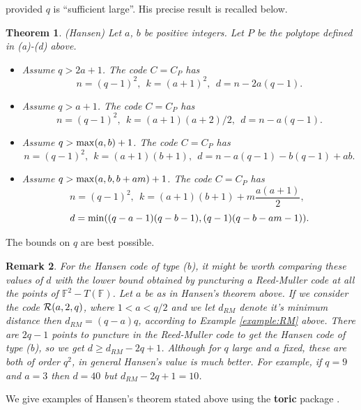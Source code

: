 \documentclass[12pt]{article}
\newtheorem{theorem}{Theorem}[section]
\newtheorem{remark}[theorem]{Remark}
\def\fff{\mathbb{F}}
\begin{document}
\noindent
provided $q$ is ``sufficient large''. His precise result is 
recalled below.

\begin{theorem} (Hansen)
\label{thrm:hansen}
Let $a$, $b$ be positive integers. Let $P$ be the polytope 
defined in (a)-(d) above. 

\begin{itemize}
\item[(a)] Assume $q>2a+1$. The code $C=C_P$ has
\[
n=(q-1)^2,\ \ k=(a+1)^2,\ \ d= n-2a(q-1).
\]

\item[(b)] Assume $q>a+1$. The code $C=C_P$ has
\[
n=(q-1)^2,\ \ k=(a+1)(a+2)/2,\ \ d= n-a(q-1).
\]

\item[(c)] Assume $q>{\rm max}(a,b)+1$. The code $C=C_P$ has
\[
n=(q-1)^2,\ \ k=(a+1)(b+1),\ \ d= n-a(q-1)-b(q-1)+ab.
\]

\item[(d)] Assume $q>{\rm max}(a,b,b+am)+1$. The code $C=C_P$ has
\[
n=(q-1)^2,\ \ k=(a+1)(b+1)+m\frac{a(a+1)}{2},\ \ 
\]
\[
d= {\rm min}((q-a-1)(q-b-1),(q-1)(q-b-am-1)).
\]

\end{itemize}
\end{theorem}

The bounds on $q$ are best possible.

\begin{remark}
For the Hansen code of type (b), it might be worth
comparing these values of $d$ with the lower bound obtained by
puncturing a Reed-Muller code at all the points of
$\fff^2-T(\fff)$. Let $a$ be as in Hansen's theorem above.
If we consider the code ${\cal R}(a,2,q)$,
where $1<a<q/2$ and we let $d_{RM}$ denote it's minimum distance
then $d_{RM}=(q-a)q$, according to Example \ref{example:RM}
above. There are $2q-1$ points to puncture in the 
Reed-Muller code to get the Hansen code of type (b), 
so we get $d\geq d_{RM}-2q+1$. Although for $q$ large
and $a$ fixed, these are both of order $q^2$, in general
Hansen's value is much better. For example, if $q=9$ and $a=3$
then $d=40$ but $ d_{RM}-2q+1=10$.
\end{remark}

We give examples of Hansen's theorem stated above
using the {\bf toric} package \cite{J}.
\end{document}
